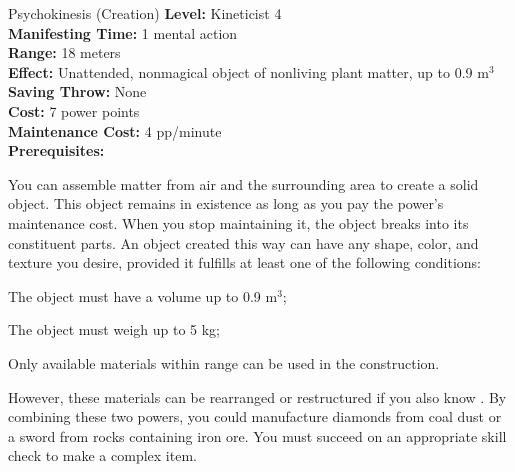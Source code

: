 {Psychokinesis (Creation)}
{
	\textbf{Level:}
	Kineticist 4\\
	\textbf{Manifesting Time:}
	1 mental action\\
	\textbf{Range:}
	18 meters\\
	\textbf{Effect:}
	Unattended, nonmagical object of nonliving plant matter, up to 0.9 m$^3$\\
	\textbf{Saving Throw:}
	None\\
	\textbf{Cost:}
	7 power points\\
	\textbf{Maintenance Cost:}
	4 pp/minute\\
	\textbf{Prerequisites:}
	\\
}
{
	You can assemble matter from air and the surrounding area to create a solid object. This object remains in existence as long as you pay the power's maintenance cost. When you stop maintaining it, the object breaks into its constituent parts. An object created this way can have any shape, color, and texture you desire, provided it fulfills at least one of the following conditions:
	\begin{enumerate*}
	\item The object must have a volume up to 0.9 m$^3$;
	\item The object must weigh up to 5 kg;
	\item Only available materials within range can be used in the construction.
	\end{enumerate*}

	However, these materials can be rearranged or restructured if you also know . By combining these two powers, you could manufacture diamonds from coal dust or a sword from rocks containing iron ore. You must succeed on an appropriate skill check to make a complex item. 
}
